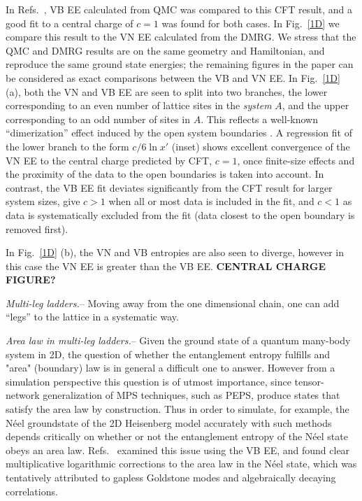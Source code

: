 \documentclass[prl,aps,twocolumn,floatfix,amsmath,amssymb,superscriptaddress,tightenlines]{revtex4}
\begin{document}
In Refs.~\cite{Alet, Chh}, VB EE calculated from QMC was compared to this CFT result, and a good fit to a central charge of $c=1$ was found for both cases.  In Fig.~\ref{1D} we compare this result to the VN EE calculated from the DMRG.  We stress that the QMC and DMRG results are on the same geometry and Hamiltonian, and reproduce the same ground state energies; the remaining figures in the paper can be considered as exact comparisons between the VB and VN EE.  In Fig.~\ref{1D} (a), both the VN and VB EE are seen to split into two branches, the lower corresponding to an even number of lattice sites in the {\it system} $A$, and the upper corresponding to an odd number of sites in $A$.  This reflects a well-known ``dimerization'' effect induced by the open system boundaries \cite{Ian1}.  A regression fit of the lower branch to the form $c/6 \ln {x'}$ (inset) shows excellent convergence of the VN EE to the central charge predicted by CFT, $c=1$, once finite-size effects and the proximity of the data to the open boundaries is taken into account.  In contrast, the VB EE fit deviates significantly from the CFT result for larger system sizes, give $c>1$ when all or most data is included in the fit, and $c<1$ as data is systematically excluded from the fit (data closest to the open boundary is removed first).

In Fig.~\ref{1D} (b), the VN and VB entropies are also seen to diverge, however in this case the VN EE is greater than the VB EE. {\bf CENTRAL CHARGE FIGURE?}

{\it Multi-leg ladders.}-- Moving away from the one dimensional chain, one can add ``legs'' to the lattice in a systematic way.

{\it Area law in multi-leg ladders.}--  Given the ground state of a quantum many-body system in 2D, the question of whether the entanglement entropy fulfills and "area" (boundary) law is in general a difficult one to answer.  
However from a simulation perspective this question is of utmost importance, since tensor-network generalization of MPS techniques, such as PEPS, produce states that satisfy the area law by construction.  Thus in order to simulate, for example, the N\'eel groundstate of the 2D Heisenberg model accurately with such methods depends critically on whether or not the entanglement entropy of the N\'eel state obeys an area law.  Refs.~\cite{Alet,Chh} examined this issue using the VB EE, and found clear multiplicative logarithmic corrections to the area law in the N\'eel state, which was tentatively attributed to gapless Goldstone modes and algebraically decaying correlations.  
\end{document}
